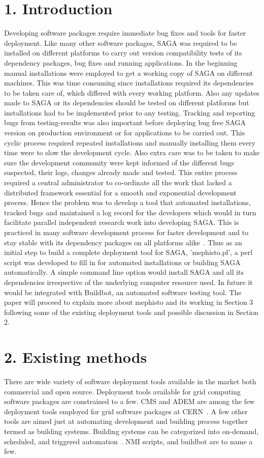 \documentclass[a4paper,10pt]{article}
\begin{document}
\begin{multicols}{2}
\section*{\normalsize 1. Introduction}
Developing software packages require immediate bug fixes and tools for faster deployment. Like many other software packages, SAGA 
was required to be installed on different platforms to carry out version compatibility tests of its dependency packages, bug fixes and running applications. 
In the beginning manual installations were employed to get a working copy of SAGA on different machines. This was time consuming 
since installations required its dependencies to be taken care of, which differed with every working platform. Also any updates made to SAGA 
or its dependencies should be tested on different platforms but installations had to be implemented prior to any testing. Tracking and reporting 
bugs from testing-results was also important before deploying bug free SAGA version on production environment or for applications
to be carried out. This cyclic process required repeated installations and manually installing them every time were to slow the development
cycle. Also extra care was to be taken to make sure the development community were kept informed of the different bugs suspected,
their logs, changes already made and tested. This entire process required a central administrator to co-ordinate all the work that lacked
a distributed framework essential for a smooth and exponential development process. Hence the problem was to develop a tool that automated 
installations, tracked bugs and maintained a log record for the developers which would in turn facilitate parallel independent research work into
developing SAGA. This is practiced in many software development process for faster development and to stay stable with its dependency 
packages on all platforms alike~\cite{nmi}. Thus as an initial step to build a complete deployment tool for SAGA, 'mephisto.pl', a perl script was developed to 
fill in for automated installations or building SAGA automatically. 
A simple command line option would install SAGA and all its dependencies irrespective of the underlying computer resource used. 
In future it would be integrated with Buildbot, an automated software testing tool. The paper will proceed to explain more about mephisto 
and its working in Section 3 following some of the existing deployment tools and possible discussion in Section 2. 
\section*{\normalsize 2. Existing methods}
There are wide variety of software deployment tools available in the market both commercial and open source. Deployment tools available for 
grid computing software packages are constrained to a few. CMS and ADEM are among the few deployment tools employed for grid software packages at 
CERN~\cite{cms,adem}. 
A few other tools are aimed just at automating development and building process together termed as building systems. Building systems can be categorized into 
on-demand, scheduled, and triggered automation~\cite{wiki-build-auto}. NMI scripts, and buildbot are to name a few. 

\end{multicols}
\end{document}
